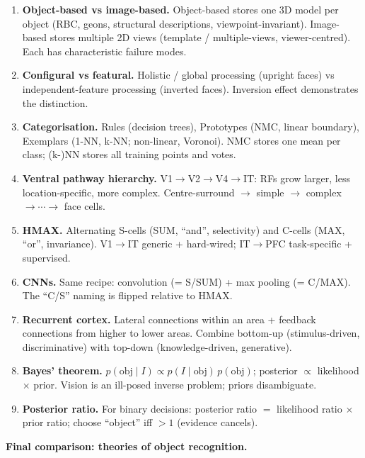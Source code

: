\begin{keybox}
\begin{enumerate}
  \item \textbf{Object-based vs image-based.} Object-based stores one 3D model per object (RBC, geons, structural descriptions, viewpoint-invariant). Image-based stores multiple 2D views (template / multiple-views, viewer-centred). Each has characteristic failure modes.
  \item \textbf{Configural vs featural.} Holistic / global processing (upright faces) vs independent-feature processing (inverted faces). Inversion effect demonstrates the distinction.
  \item \textbf{Categorisation.} Rules (decision trees), Prototypes (NMC, linear boundary), Exemplars (1-NN, k-NN; non-linear, Voronoi). NMC stores one mean per class; (k-)NN stores all training points and votes.
  \item \textbf{Ventral pathway hierarchy.} V1$\rightarrow$V2$\rightarrow$V4$\rightarrow$IT: RFs grow larger, less location-specific, more complex. Centre-surround $\rightarrow$ simple $\rightarrow$ complex $\rightarrow \cdots \rightarrow$ face cells.
  \item \textbf{HMAX.} Alternating S-cells (SUM, ``and'', selectivity) and C-cells (MAX, ``or'', invariance). V1$\rightarrow$IT generic + hard-wired; IT$\rightarrow$PFC task-specific + supervised.
  \item \textbf{CNNs.} Same recipe: convolution (= S/SUM) + max pooling (= C/MAX). The ``C/S'' naming is flipped relative to HMAX.
  \item \textbf{Recurrent cortex.} Lateral connections within an area + feedback connections from higher to lower areas. Combine bottom-up (stimulus-driven, discriminative) with top-down (knowledge-driven, generative).
  \item \textbf{Bayes' theorem.} $p(\text{obj}\mid I) \propto p(I\mid\text{obj})\, p(\text{obj})$; posterior $\propto$ likelihood $\times$ prior. Vision is an ill-posed inverse problem; priors disambiguate.
  \item \textbf{Posterior ratio.} For binary decisions: posterior ratio $=$ likelihood ratio $\times$ prior ratio; choose ``object'' iff $> 1$ (evidence cancels).
\end{enumerate}
\end{keybox}

\textbf{Final comparison: theories of object recognition.}

